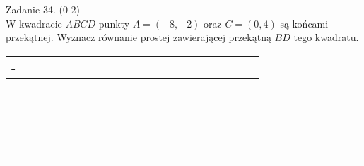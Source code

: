 \documentclass[10pt]{article}
\begin{document}
Zadanie 34. (0-2)\\
W kwadracie \(A B C D\) punkty \(A=(-8,-2)\) oraz \(C=(0,4)\) są końcami przekątnej. Wyznacz równanie prostej zawierającej przekątną \(B D\) tego kwadratu.

\begin{center}
\begin{tabular}{|c|c|c|c|c|c|c|c|c|c|c|c|c|c|c|c|c|c|c|c|c|c|}
\hline
- &  &  &  &  &  &  &  &  &  &  &  &  &  &  &  &  &  &  &  &  &  \\
\hline
 &  &  &  &  &  &  &  &  &  &  &  &  &  &  &  &  &  &  &  &  &  \\
\hline
 &  &  &  &  &  &  &  &  &  &  &  &  &  &  &  &  &  &  &  &  &  \\
\hline
 &  &  &  &  &  &  &  &  &  &  &  &  &  &  &  &  &  &  &  &  &  \\
\hline
 &  &  &  &  &  &  &  &  &  &  &  &  &  &  &  &  &  &  &  &  &  \\
\hline
 &  &  &  &  &  &  &  &  &  &  &  &  &  &  &  &  &  &  &  &  &  \\
\hline
 &  &  &  &  &  &  &  &  &  &  &  &  &  &  &  &  &  &  &  &  &  \\
\hline
 &  &  &  &  &  &  &  &  &  &  &  &  &  &  &  &  &  &  &  &  &  \\
\hline
 &  &  &  &  &  &  &  &  &  &  &  &  &  &  &  &  &  &  &  &  &  \\
\hline
 &  &  &  &  &  &  &  &  &  &  &  &  &  &  &  &  &  &  &  &  &  \\
\hline
 &  &  &  &  &  &  &  &  &  &  &  &  &  &  &  &  &  &  &  &  &  \\
\hline
 &  &  &  &  &  &  &  &  &  &  &  &  &  &  &  &  &  &  &  &  &  \\
\hline
 &  &  &  &  &  &  &  &  &  &  &  &  &  &  &  &  &  &  &  &  &  \\
\hline
 &  &  &  &  &  &  &  &  &  &  &  &  &  &  &  &  &  &  &  &  &  \\
\hline
 &  &  &  &  &  &  &  &  &  &  &  &  &  &  &  &  &  &  &  &  &  \\
\hline
 &  &  &  &  &  &  &  &  &  &  &  &  &  &  &  &  &  &  &  &  &  \\
\hline
 &  &  &  &  &  &  &  &  &  &  &  &  &  &  &  &  &  &  &  &  &  \\
\hline
 &  &  &  &  &  &  &  &  &  &  &  &  &  &  &  &  &  &  &  &  &  \\
\hline
 &  &  &  &  &  &  &  &  &  &  &  &  &  &  &  &  &  &  &  &  &  \\
\hline
 &  &  &  &  &  &  &  &  &  &  &  &  &  &  &  &  &  &  &  &  &  \\

\end{tabular}
\end{center}
\end{document}
